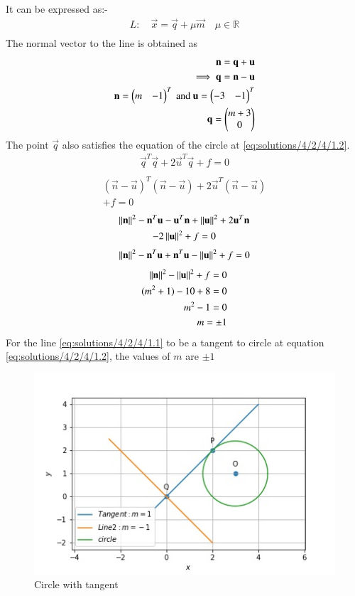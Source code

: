 It can be expressed as:-
\begin{align}
L: \quad \vec{x} = \vec{q} + \mu \vec{m} \quad \mu \in \mathbb{R} \label{eq:solutions/4/2/4/2.10} \\
\end{align}
The normal vector to the line is obtained as
\begin{align}
\mathbf{n} = \mathbf{q} + \mathbf{u}\\
\implies \mathbf{q}  = \mathbf{n} -  \mathbf{u}\\
\mathbf{n} =\begin{pmatrix}m & -1 \end{pmatrix}^T  \text{ and } \mathbf{u} =\begin{pmatrix}-3 & -1\end{pmatrix}^T\\
\mathbf{q} = \begin{pmatrix}m+3 \\ 0\end{pmatrix}
\end{align}
The point $\vec{q}$ also satisfies the equation of the circle at \ref{eq:solutions/4/2/4/1.2}.
\begin{align}
\vec{q}^T\vec{q}+ 2\vec{u}^T\vec{q} + f = 0 \\
\end{align}
\begin{multline}
(\vec{n} -\vec{ u})^T(\vec{n} -\vec{ u})+2\vec{u}^T(\vec{n} -\vec{ u})\\+f = 0
\end{multline}
\begin{multline}
\left\lVert\mathbf{n}\right\rVert^2 - \mathbf{n}^T \mathbf{u} - \mathbf{u}^T\mathbf{n} + \left\lVert\mathbf{u}\right\rVert^2  + 2\mathbf{u}^T\mathbf{n}\\ -2 \left\lVert\mathbf{u}\right\rVert^2 +f = 0 
\end{multline}
\begin{multline}
\left\lVert\mathbf{n}\right\rVert^2 - \mathbf{n}^T \mathbf{u} +\mathbf{n}^T\mathbf{u} - \left\lVert\mathbf{u}\right\rVert^2  +f = 0 
\end{multline}
\begin{align}
\left\lVert\mathbf{n}\right\rVert^2 - \left\lVert\mathbf{u}\right\rVert^2  +f = 0\\ 
(m^2 +1) - 10 +8 = 0 \\
m^2 -1 =0\\
m=\pm 1
\end{align}
For the line \ref{eq:solutions/4/2/4/1.1} to be a tangent to circle at equation \ref{eq:solutions/4/2/4/1.2}, the values of $m$ are $\pm1$
\begin{figure}[!]
\includegraphics[width=1\columnwidth]{./solutions/4/2/4/CircleTangent.jpg}
\caption{Circle with tangent}
\label{eq:solutions/4/2/4/}
\end{figure}


